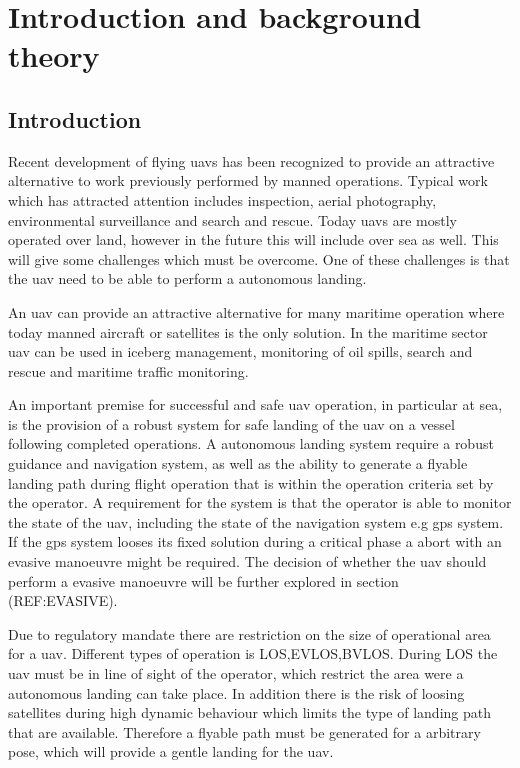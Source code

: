 \part{Introduction and background theory}
\chapter{Introduction}
Recent development of flying \glspl{uav} has been recognized to provide an attractive alternative to work previously performed by manned operations. Typical work which has attracted attention includes inspection, aerial photography, environmental surveillance and search and rescue. Today \glspl{uav} are mostly operated over land, however in the future this will include over sea as well. This will give some challenges which must be overcome. One of these challenges is that the \gls{uav} need to be able to perform a autonomous landing.

An \gls{uav} can provide an attractive alternative for many maritime operation where today manned aircraft or satellites is the only solution. In the maritime sector \gls{uav} can be used in iceberg management, monitoring of oil spills, search and rescue and maritime traffic monitoring.

An important premise for successful and safe \gls{uav} operation, in particular at sea, is the provision of a robust system for safe landing of the \gls{uav} on a vessel following completed operations. A autonomous landing system require a robust guidance and navigation system, as well as the ability to generate a flyable landing path during flight operation that is within the operation criteria set by the operator. A requirement for the system is that the operator is able to monitor the state of the uav, including the state of the navigation system e.g gps system. If the gps system looses its fixed solution during a critical phase a abort with an evasive manoeuvre might be required. The decision of whether the uav should perform a evasive manoeuvre will be further explored in section (REF:EVASIVE).

Due to regulatory mandate there are restriction on the size of operational area for a uav. Different types of operation is LOS,EVLOS,BVLOS. During LOS the uav must be in line of sight of the operator, which restrict the area were a autonomous landing can take place. In addition there is the risk of loosing satellites during high dynamic behaviour which limits the type of landing path that are available. Therefore a flyable path must be generated for a arbitrary pose, which will provide a gentle landing for the uav.
